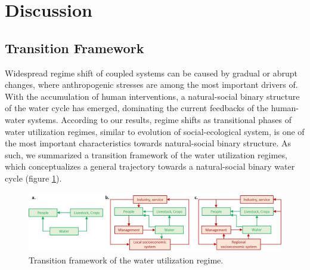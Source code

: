 \documentclass[9pt, twocolumn, twoside, lineno]{pnas-new}
\begin{document}
\section*{Discussion}

\subsection*{Transition Framework}
Widespread regime shift of coupled systems can be caused by gradual or abrupt changes, 
where anthropogenic stresses are among the most important drivers of. 
With the accumulation of human interventions, 
a natural-social binary structure of the water cycle has emerged, 
dominating the current feedbacks of the human-water systems.
According to our results, 
regime shifts as transitional phases of water utilization regimes, 
similar to evolution of social-ecological system, 
is one of the most important characteristics towards natural-social binary structure.
As such, we summarized a transition framework of the water utilization regimes, 
which conceptualizes a general trajectory towards a natural-social binary water cycle (figure \ref{fig:framework}).


\begin{figure}%
	\centering
	\includegraphics[width=\linewidth]{../../figures/main_text/framework}
	\caption{Transition framework of the water utilization regime.}
	\label{fig:framework}
\end{figure}
\end{document}
